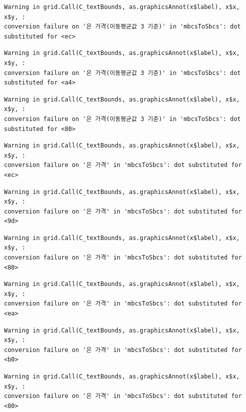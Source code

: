 \documentclass[
  letterpaper,
  DIV=11,
  numbers=noendperiod]{scrreprt}
\begin{document}
\begin{verbatim}
Warning in grid.Call(C_textBounds, as.graphicsAnnot(x$label), x$x, x$y, :
conversion failure on '은 가격(이동평균값 3 기준)' in 'mbcsToSbcs': dot
substituted for <ec>
\end{verbatim}

\begin{verbatim}
Warning in grid.Call(C_textBounds, as.graphicsAnnot(x$label), x$x, x$y, :
conversion failure on '은 가격(이동평균값 3 기준)' in 'mbcsToSbcs': dot
substituted for <a4>
\end{verbatim}

\begin{verbatim}
Warning in grid.Call(C_textBounds, as.graphicsAnnot(x$label), x$x, x$y, :
conversion failure on '은 가격(이동평균값 3 기준)' in 'mbcsToSbcs': dot
substituted for <80>
\end{verbatim}

\begin{verbatim}
Warning in grid.Call(C_textBounds, as.graphicsAnnot(x$label), x$x, x$y, :
conversion failure on '은 가격' in 'mbcsToSbcs': dot substituted for <ec>
\end{verbatim}

\begin{verbatim}
Warning in grid.Call(C_textBounds, as.graphicsAnnot(x$label), x$x, x$y, :
conversion failure on '은 가격' in 'mbcsToSbcs': dot substituted for <9d>
\end{verbatim}

\begin{verbatim}
Warning in grid.Call(C_textBounds, as.graphicsAnnot(x$label), x$x, x$y, :
conversion failure on '은 가격' in 'mbcsToSbcs': dot substituted for <80>
\end{verbatim}

\begin{verbatim}
Warning in grid.Call(C_textBounds, as.graphicsAnnot(x$label), x$x, x$y, :
conversion failure on '은 가격' in 'mbcsToSbcs': dot substituted for <ea>
\end{verbatim}

\begin{verbatim}
Warning in grid.Call(C_textBounds, as.graphicsAnnot(x$label), x$x, x$y, :
conversion failure on '은 가격' in 'mbcsToSbcs': dot substituted for <b0>
\end{verbatim}

\begin{verbatim}
Warning in grid.Call(C_textBounds, as.graphicsAnnot(x$label), x$x, x$y, :
conversion failure on '은 가격' in 'mbcsToSbcs': dot substituted for <80>
\end{verbatim}
\end{document}
